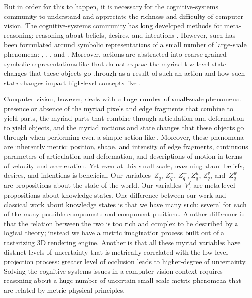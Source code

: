 But in order for this to happen, it is necessary for the cognitive-systems
community to understand and appreciate the richness and difficulty of computer
vision.
%
The cognitive-systems community has long developed methods for meta-reasoning:
reasoning about beliefs, desires, and intentions
\cite{Moore1982,Bratman1988,bratman1990,Cohen1990,Rao1991,hobbs1993}.
%
However, such has been formulated around symbolic representations of a small
number of large-scale phenomena:\!
, ,
, and 
.
%
Moreover, actions are abstracted into coarse-grained symbolic representations
like  that do not expose the myriad low-level state
changes that these objects go through as a result of such an action and how
such state changes impact high-level concepts like
.

Computer vision, however, deals with a huge number of small-scale phenomena:
presence or absence of the myriad pixels and edge fragments that combine to
yield parts, the myriad parts that combine through articulation and deformation
to yield objects, and the myriad motions and state changes that these objects
go through when performing even a simple action like .
%
Moreover, these phenomena are inherently metric: position, shape, and intensity
of edge fragments, continuous parameters of articulation and deformation, and
descriptions of motion in terms of velocity and acceleration.
%
Yet even at this small scale, reasoning about beliefs, desires, and intentions
is beneficial.
%
Our variables~$Z_q$, $Z^+_q$, $Z^-_q$, $Z^u_q$, $Z^v_q$, and~$Z^w_q$ are
propositions about the state of the world.
%
Our variables~$V^f_q$ are meta-level propositions about knowledge states.
%
One difference between our work and classical work about knowledge states is
that we have many such: several for each of the many possible components and
component positions.
%
Another difference is that the relation between the two is too rich and complex
to be described by a logical theory; instead we have a metric imagination
process built out of a rasterizing 3D rendering engine.
%
Another is that all these myriad variables have distinct levels of uncertainty
that is metrically correlated with the low-level projection process: greater level
of occlusion leads to higher-degree of uncertainty.
%
Solving the cognitive-systems issues in a computer-vision context requires
reasoning about a huge number of uncertain small-scale metric phenomena that are
related by metric physical principles.

